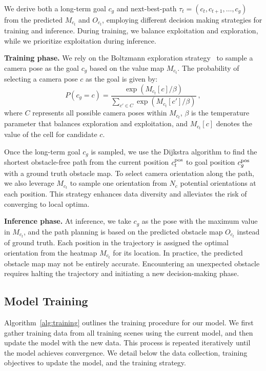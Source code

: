 We derive both a long-term goal $c_g$ and next-best-path $\tau_t = (c_t, c_{t+1}, \ldots, c_g)$ from the predicted $M_{c_t}$ and $O_{c_t}$, employing different decision making strategies for training and inference. During training, we balance exploitation and exploration, while we prioritize exploitation during inference.

\textbf{Training phase.} We rely on the Boltzmann exploration strategy~\citep{cesa2017boltzmann} to sample a camera pose as the goal $c_g$ based on the value map $M_{c_t}$. The probability of selecting a camera pose $c$ as the goal is given by:
%
\begin{equation}
P(c_g = c) = \frac{\exp(M_{c_t}[c] / \beta)}{\sum_{c' \in C} \exp(M_{c_t}[c'] / \beta)} \> ,
\end{equation}
%
where $C$ represents all possible camera poses within $M_{c_t}$, $\beta$ is the temperature parameter that balances exploration and exploitation, and $M_{c_t}[c]$ denotes the value of the cell for candidate $c$. 

Once the long-term goal $c_g$ is sampled, we use the Dijkstra algorithm to find the shortest obstacle-free path from the current position $c^{\text{pos}}_t$ to goal position $c^{\text{pos}}_g$ with a ground truth obstacle map. 
To select camera orientation along the path, we also leverage $M_{c_t}$ to sample one orientation from $N_c$ potential orientations at each position. 
This strategy enhances data diversity and alleviates the risk of converging to local optima.




\textbf{Inference phase.} 
%
At inference, we take $c_g$ as the pose with the maximum value in $M_{c_t}$, and the path planning is based on the predicted obstacle map $O_{c_t}$ instead of ground truth.
Each position in the trajectory is assigned the optimal orientation from the heatmap $M_{c_t}$ for its location.
In practice, the predicted obstacle map may not be entirely accurate. Encountering an unexpected obstacle requires halting the trajectory and initiating a new decision-making phase.


\subsection{Model Training}
\label{sec:method_training} 


% 
% 


Algorithm~\ref{alg:training} outlines the training procedure for our model.
We first gather training data from all training scenes using the current model, and then update the model with the new data. This process is repeated iteratively until the model achieves convergence.
We detail below the data collection, training objectives to update the model, and the training strategy.



